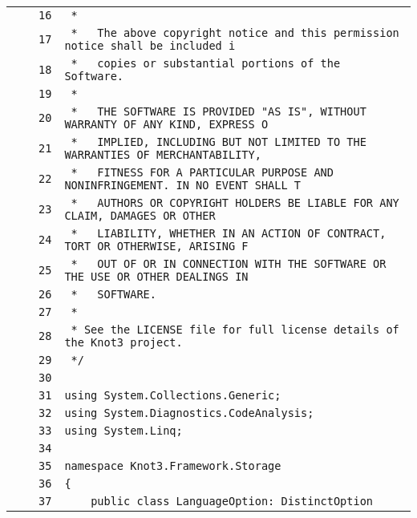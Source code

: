 \documentclass[a4paper,10pt]{article}
\begin{document}
\begin{longtable}[l]{lrrl}
\cellcolor{gray} &  & \verb~16~ & \verb~ *~\\
\cellcolor{gray} &  & \verb~17~ & \verb~ *   The above copyright notice and this permission notice shall be included i~\\
\cellcolor{gray} &  & \verb~18~ & \verb~ *   copies or substantial portions of the Software.~\\
\cellcolor{gray} &  & \verb~19~ & \verb~ *~\\
\cellcolor{gray} &  & \verb~20~ & \verb~ *   THE SOFTWARE IS PROVIDED "AS IS", WITHOUT WARRANTY OF ANY KIND, EXPRESS O~\\
\cellcolor{gray} &  & \verb~21~ & \verb~ *   IMPLIED, INCLUDING BUT NOT LIMITED TO THE WARRANTIES OF MERCHANTABILITY,~\\
\cellcolor{gray} &  & \verb~22~ & \verb~ *   FITNESS FOR A PARTICULAR PURPOSE AND NONINFRINGEMENT. IN NO EVENT SHALL T~\\
\cellcolor{gray} &  & \verb~23~ & \verb~ *   AUTHORS OR COPYRIGHT HOLDERS BE LIABLE FOR ANY CLAIM, DAMAGES OR OTHER~\\
\cellcolor{gray} &  & \verb~24~ & \verb~ *   LIABILITY, WHETHER IN AN ACTION OF CONTRACT, TORT OR OTHERWISE, ARISING F~\\
\cellcolor{gray} &  & \verb~25~ & \verb~ *   OUT OF OR IN CONNECTION WITH THE SOFTWARE OR THE USE OR OTHER DEALINGS IN~\\
\cellcolor{gray} &  & \verb~26~ & \verb~ *   SOFTWARE.~\\
\cellcolor{gray} &  & \verb~27~ & \verb~ *~\\
\cellcolor{gray} &  & \verb~28~ & \verb~ * See the LICENSE file for full license details of the Knot3 project.~\\
\cellcolor{gray} &  & \verb~29~ & \verb~ */~\\
\cellcolor{gray} &  & \verb~30~ & \verb~~\\
\cellcolor{gray} &  & \verb~31~ & \verb~using System.Collections.Generic;~\\
\cellcolor{gray} &  & \verb~32~ & \verb~using System.Diagnostics.CodeAnalysis;~\\
\cellcolor{gray} &  & \verb~33~ & \verb~using System.Linq;~\\
\cellcolor{gray} &  & \verb~34~ & \verb~~\\
\cellcolor{gray} &  & \verb~35~ & \verb~namespace Knot3.Framework.Storage~\\
\cellcolor{gray} &  & \verb~36~ & \verb~{~\\
\cellcolor{gray} &  & \verb~37~ & \verb~    public class LanguageOption: DistinctOption~\\

\end{longtable}
\end{document}
